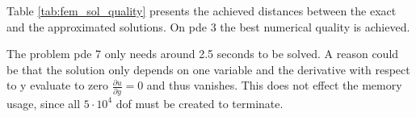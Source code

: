 \documentclass[./\jobname.tex]{subfiles}
\begin{document}
Table \ref{tab:fem_sol_quality} presents the achieved distances between the exact and the approximated solutions. On \gls{pde} 3 the best numerical quality is achieved.

The problem \gls{pde} 7 only needs around 2.5 seconds to be solved. A reason could be that the solution only depends on one variable and the derivative with respect to y evaluate to zero $\frac{\partial u}{\partial y} = 0$ and thus vanishes. This does not effect the memory usage, since all $5 \cdot 10^4$ \gls{dof} must be created to terminate. 

\begin{table}[h]
	\centering
	\noindent{}
	\label{tab:fem_sol_quality}
\end{table}
\end{document}
